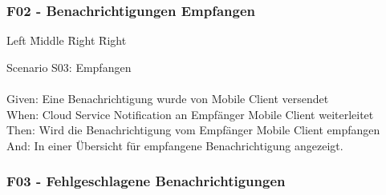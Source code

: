 \subsubsection*{F02 - Benachrichtigungen Empfangen}
\begin{tabbing}
    Left \= Middle \= Right \= Right  \kill

    Scenario S03: \>  \> \> Empfangen\\ \\
    Given: \>  \> \>  Eine Benachrichtigung wurde von Mobile Client versendet\\
    When: \>  \> \>   Cloud Service Notification an Empfänger Mobile Client weiterleitet\\
    Then: \>  \> \>   Wird die Benachrichtigung vom Empfänger Mobile Client empfangen\\
    And: \>  \> \>    In einer Übersicht für empfangene Benachrichtigung angezeigt.\\

\end{tabbing}

\clearpage
\subsubsection*{F03 - Fehlgeschlagene Benachrichtigungen}

